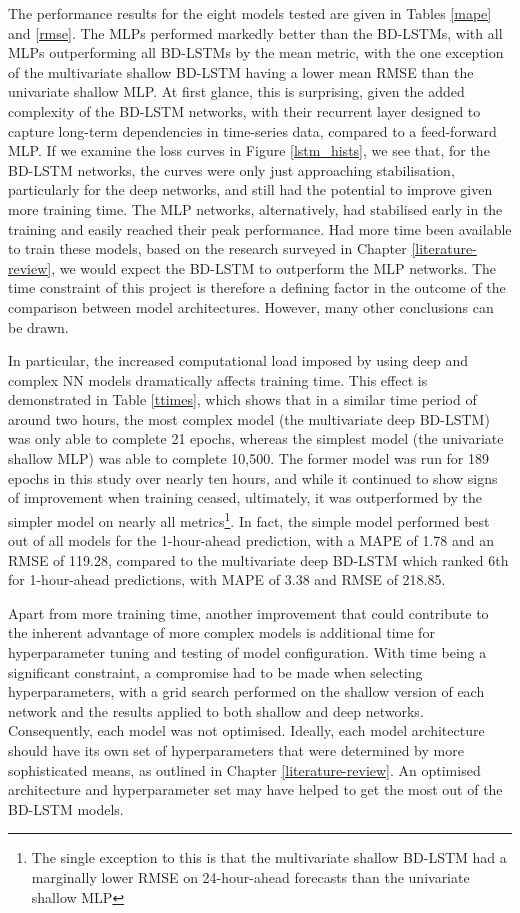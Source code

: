 \documentclass[mstat,12pt]{unswthesis}
\begin{document}
The performance results for the eight models tested are given in Tables \ref{mape} and \ref{rmse}. The MLPs performed markedly better than the BD-LSTMs, with all MLPs outperforming all BD-LSTMs by the mean metric, with the one exception of the multivariate shallow BD-LSTM having a lower mean RMSE than the univariate shallow MLP. At first glance, this is surprising, given the added complexity of the BD-LSTM networks, with their recurrent layer designed to capture long-term dependencies in time-series data, compared to a feed-forward MLP. If we examine the loss curves in Figure \ref{lstm_hists}, we see that, for the BD-LSTM networks, the curves were only just approaching stabilisation, particularly for the deep networks, and still had the potential to improve given more training time. The MLP networks, alternatively, had stabilised early in the training and easily reached their peak performance. Had more time been available to train these models, based on the research surveyed in Chapter \ref{literature-review}, we would expect the BD-LSTM to outperform the MLP networks. The time constraint of this project is therefore a defining factor in the outcome of the comparison between model architectures. However, many other conclusions can be drawn. 

In particular, the increased computational load imposed by using deep and complex NN models dramatically affects training time. This effect is demonstrated in Table \ref{ttimes}, which shows that in a similar time period of around two hours, the most complex model (the multivariate deep BD-LSTM) was only able to complete 21 epochs, whereas the simplest model (the univariate shallow MLP) was able to complete 10,500. The former model was run for 189 epochs in this study over nearly ten hours, and while it continued to show signs of improvement when training ceased, ultimately, it was outperformed by the simpler model on nearly all metrics\footnote{The single exception to this is that the multivariate shallow BD-LSTM had a marginally lower RMSE on 24-hour-ahead forecasts than the univariate shallow MLP}. In fact, the simple model performed best out of all models for the 1-hour-ahead prediction, with a MAPE of 1.78 and an RMSE of 119.28, compared to the multivariate deep BD-LSTM which ranked 6th for 1-hour-ahead predictions, with MAPE of 3.38 and RMSE of 218.85. 

Apart from more training time, another improvement that could contribute to the inherent advantage of more complex models is additional time for hyperparameter tuning and testing of model configuration. With time being a significant constraint, a compromise had to be made when selecting hyperparameters, with a grid search performed on the shallow version of each network and the results applied to both shallow and deep networks. Consequently, each model was not optimised. Ideally, each model architecture should have its own set of hyperparameters that were determined by more sophisticated means, as outlined in Chapter \ref{literature-review}. An optimised architecture and hyperparameter set may have helped to get the most out of the BD-LSTM models.
\end{document}
